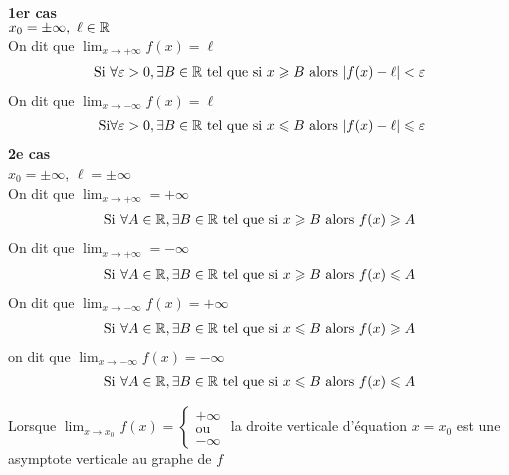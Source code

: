 \begin{graybox}
    \begin{definition}~
        \\
\textbf{1er cas} \\
$x_0 = \pm \infty,\ \ell \in \mathbb{R}$ \\
On dit que $\displaystyle \lim_{x \to +\infty} f(x) = \ell $
\begin{align*}
    \text{Si } \forall \varepsilon > 0, \exists B \in \mathbb{R} \text{ tel que si } x \geqslant B \text{ alors } |f(x) - \ell| < \varepsilon
\end{align*}
On dit que $\displaystyle \lim_{x \to -\infty} f(x) = \ell $
\begin{align*}
    \text{ Si} \forall \varepsilon > 0, \exists B \in \mathbb{R} \text{ tel que si } x \leqslant B \text{ alors } |f(x) - \ell| \leqslant \varepsilon
\end{align*}
\textbf{2e cas} \\
$x_0 = \pm \infty$, $\ell = \pm \infty$ \\
On dit que $\displaystyle \lim_{x \to +\infty} = +\infty$ 
\begin{align*}
    \text{Si } \forall A \in \mathbb{R}, \exists B \in \mathbb{R} \text{ tel que si } x \geqslant B \text{ alors } f(x) \geqslant A
\end{align*}
On dit que $\lim_{x \to +\infty} = -\infty$
\begin{align*}
    \text{Si } \forall A \in \mathbb{R}, \exists B \in \mathbb{R} \text{ tel que si } x \geqslant B \text{ alors } f(x) \leqslant A
\end{align*}
On dit que $\displaystyle \lim_{x \to -\infty} f(x) = +\infty$ 
\begin{align*}
    \text{Si } \forall A \in \mathbb{R}, \exists B \in \mathbb{R} \text{ tel que si } x \leqslant B \text{ alors } f(x) \geqslant A
\end{align*}
on dit que $\displaystyle \lim_{x \to -\infty} f(x) = -\infty$
\begin{align*}
    \text{Si } \forall A \in \mathbb{R}, \exists B \in \mathbb{R} \text{ tel que si } x \leqslant B \text{ alors } f(x) \leqslant A
\end{align*}

\end{definition}
\end{graybox}
\begin{remarque}
    Lorsque $\displaystyle \lim_{x \to x_0} f(x) = 
        \begin{cases}
            +\infty \\
            \text{ou} \\
            -\infty
        \end{cases}$
    la droite verticale d'équation $x = x_0$ est une asymptote verticale au graphe de $f$
\end{remarque}

